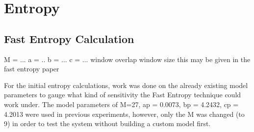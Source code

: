 \section{Entropy}


\subsection{Fast Entropy Calculation}

M = ...
a = ..
b = ...
c = ...
window overlap
window size
this may be given in the fast entropy paper

For the initial entropy calculations, work was done on the already existing model parameters to gauge what kind of sensitivity the Fast Entropy technique could work under. The model parameters of M=27, ap = 0.0073, bp = 4.2432, cp = 4.2013 were used in previous experiments, however, only the M was changed (to 9) in order to test the system without building a custom model first. \\
